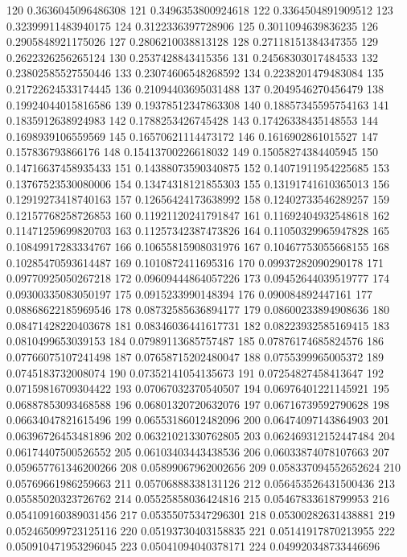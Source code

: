 120 0.3636045096486308
121 0.3496353800924618
122 0.3364504891909512
123 0.32399911483940175
124 0.3122336397728906
125 0.3011094639836235
126 0.2905848921175026
127 0.2806210038813128
128 0.27118151384347355
129 0.2622326256265124
130 0.2537428843415356
131 0.24568303017484533
132 0.23802585527550446
133 0.23074606548268592
134 0.2238201479483084
135 0.21722624533174445
136 0.21094403695031488
137 0.2049546270456479
138 0.19924044015816586
139 0.19378512347863308
140 0.18857345595754163
141 0.1835912638924983
142 0.1788253426745428
143 0.17426338435148553
144 0.1698939106559569
145 0.16570621114473172
146 0.1616902861015527
147 0.157836793866176
148 0.15413700226618032
149 0.15058274384405945
150 0.14716637458935433
151 0.14388073590340875
152 0.14071911954225685
153 0.13767523530080006
154 0.13474318121855303
155 0.13191741610365013
156 0.12919273418740163
157 0.12656424173638992
158 0.12402733546289257
159 0.12157768258726853
160 0.11921120241791847
161 0.11692404932548618
162 0.11471259699820703
163 0.11257342387473826
164 0.11050329965947828
165 0.10849917283334767
166 0.10655815908031976
167 0.10467753055668155
168 0.10285470593614487
169 0.1010872411695316
170 0.09937282090290178
171 0.09770925050267218
172 0.09609444864057226
173 0.09452644039519777
174 0.09300335083050197
175 0.0915233990148394
176 0.090084892447161
177 0.08868622185969546
178 0.08732585636894177
179 0.08600233894908636
180 0.08471428220403678
181 0.08346036441617731
182 0.08223932585169415
183 0.0810499653039153
184 0.07989113685757487
185 0.07876174685824576
186 0.07766075107241498
187 0.07658715202480047
188 0.0755399965005372
189 0.0745183732008074
190 0.07352141054135673
191 0.07254827458413647
192 0.07159816709304422
193 0.07067032370540507
194 0.06976401221145921
195 0.06887853093468588
196 0.06801320720632076
197 0.06716739592790628
198 0.06634047821615496
199 0.06553186012482096
200 0.06474097143864903
201 0.06396726453481896
202 0.06321021330762805
203 0.062469312152447484
204 0.06174407500526552
205 0.06103403443438536
206 0.06033874078107663
207 0.059657761346200266
208 0.05899067962002656
209 0.058337094552652624
210 0.05769661986259663
211 0.05706888338131126
212 0.056453526431500436
213 0.05585020323726762
214 0.05525858036424816
215 0.05467833618799953
216 0.054109160389031456
217 0.05355075347296301
218 0.05300282631438881
219 0.052465099723125116
220 0.05193730403158835
221 0.05141917870213955
222 0.050910471953296045
223 0.05041094040378171
224 0.049920348733446696
